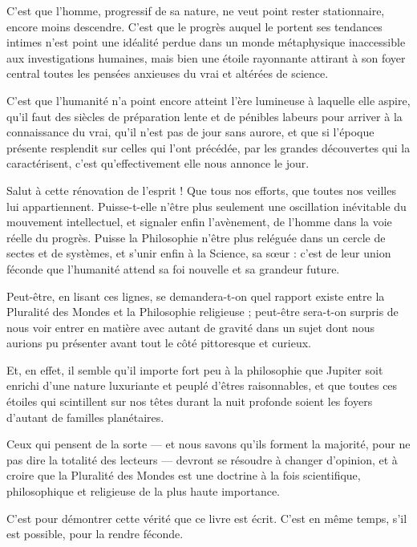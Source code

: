 \documentclass[a4paper, 11pt, oneside]{article}
\begin{document}
C'est que l'homme, progressif de sa nature, ne veut point rester stationnaire, encore moins descendre. C'est que le progrès auquel le portent ses tendances intimes n'est point une idéalité perdue dans un monde métaphysique inaccessible aux investigations humaines, mais bien une étoile rayonnante attirant à son foyer central toutes les pensées anxieuses du vrai et altérées de science.

C'est que l'humanité n'a point encore atteint l'ère lumineuse à laquelle elle aspire, qu'il faut des siècles de préparation lente et de pénibles labeurs pour arriver à la connaissance du vrai, qu'il n'est pas de jour sans aurore, et que si l'époque présente resplendit sur celles qui l'ont précédée, par les grandes découvertes qui la caractérisent, c'est qu'effectivement elle nous annonce le jour.

Salut à cette rénovation de l'esprit ! Que tous nos efforts, que toutes nos veilles lui appartiennent. Puisse-t-elle n'être plus seulement une oscillation inévitable du mouvement intellectuel, et signaler enfin l'avènement, de l'homme dans la voie réelle du progrès. Puisse la Philosophie n'être plus reléguée dans un cercle de sectes et de systèmes, et s'unir enfin à la Science, sa sœur : c'est de leur union féconde que l'humanité attend sa foi nouvelle et sa grandeur future.

Peut-être, en lisant ces lignes, se demandera-t-on quel rapport existe entre la Pluralité des Mondes et la Philosophie religieuse ; peut-être sera-t-on surpris de nous voir entrer en matière avec autant de gravité dans un sujet dont nous aurions pu présenter avant tout le côté pittoresque et curieux.

Et, en effet, il semble qu'il importe fort peu à la philosophie que Jupiter soit enrichi d'une nature luxuriante et peuplé d'êtres raisonnables, et que toutes ces étoiles qui scintillent sur nos têtes durant la nuit profonde soient les foyers d'autant de familles planétaires.

Ceux qui pensent de la sorte --- et nous savons qu'ils forment la majorité, pour ne pas dire la totalité des lecteurs --- devront se résoudre à changer d'opinion, et à croire que la Pluralité des Mondes est une doctrine à la fois scientifique, philosophique et religieuse de la plus haute importance.

C'est pour démontrer cette vérité que ce livre est écrit. C'est en même temps, s'il est possible, pour la rendre féconde.
\end{document}

